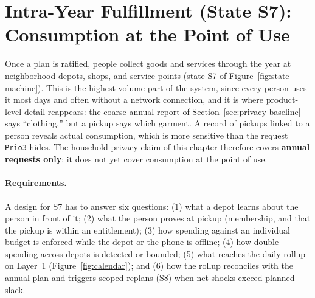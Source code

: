 \documentclass[10pt,twoside,openany]{book}
\theoremstyle{dpepstyle}
\begin{document}
\section{Intra-Year Fulfillment (State S7): Consumption at the Point of Use}
\label{sec:fulfilment}

Once a plan is ratified, people collect goods and services through the year at neighborhood depots, shops, and service points (state S7 of Figure~\ref{fig:state-machine}). This is the highest-volume part of the system, since every person uses it most days and often without a network connection, and it is where product-level detail reappears: the coarse annual report of Section~\ref{sec:privacy-baseline} says ``clothing,'' but a pickup says which garment. A record of pickups linked to a person reveals actual consumption, which is more sensitive than the request \texttt{Prio3} hides. The household privacy claim of this chapter therefore covers \textbf{annual requests only}; it does not yet cover consumption at the point of use.

\paragraph{Requirements.} A design for S7 has to answer six questions: (1) what a depot learns about the person in front of it; (2) what the person proves at pickup (membership, and that the pickup is within an entitlement); (3) how spending against an individual budget is enforced while the depot or the phone is offline; (4) how double spending across depots is detected or bounded; (5) what reaches the daily rollup on Layer~1 (Figure~\ref{fig:calendar}); and (6) how the rollup reconciles with the annual plan and triggers scoped replans (S8) when net shocks exceed planned slack.
\end{document}
